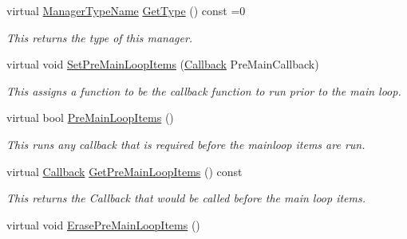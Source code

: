 \begin{DoxyCompactItemize}
virtual \hyperlink{classphys_1_1ManagerBase_aaa6ccddf23892eaccb898529414f80a5}{ManagerTypeName} \hyperlink{classphys_1_1ManagerBase_aff400b6599db635e24796d8221e9a0e3}{GetType} () const =0
\begin{DoxyCompactList}\small\item\em This returns the type of this manager. \item\end{DoxyCompactList}\item 
virtual void \hyperlink{classphys_1_1ManagerBase_a3fcf207a451d0047f884babadd0bc53e}{SetPreMainLoopItems} (\hyperlink{classphys_1_1ManagerBase_a753f5f0127131529767beab2502f480b}{Callback} PreMainCallback)
\begin{DoxyCompactList}\small\item\em This assigns a function to be the callback function to run prior to the main loop. \item\end{DoxyCompactList}\item 
virtual bool \hyperlink{classphys_1_1ManagerBase_af6210834a8af592481cf6aefa9916d88}{PreMainLoopItems} ()
\begin{DoxyCompactList}\small\item\em This runs any callback that is required before the mainloop items are run. \item\end{DoxyCompactList}\item 
virtual \hyperlink{classphys_1_1ManagerBase_a753f5f0127131529767beab2502f480b}{Callback} \hyperlink{classphys_1_1ManagerBase_a02a92b0d5df8b8b877822bdf57ec8ffc}{GetPreMainLoopItems} () const 
\begin{DoxyCompactList}\small\item\em This returns the Callback that would be called before the main loop items. \item\end{DoxyCompactList}\item 
\hypertarget{classphys_1_1ManagerBase_aa068aefaf902c87dc641b463ac93ff36}{
virtual void \hyperlink{classphys_1_1ManagerBase_aa068aefaf902c87dc641b463ac93ff36}{ErasePreMainLoopItems} ()}
\label{d2/de3/classphys_1_1ManagerBase_aa068aefaf902c87dc641b463ac93ff36}


\end{DoxyCompactItemize}
